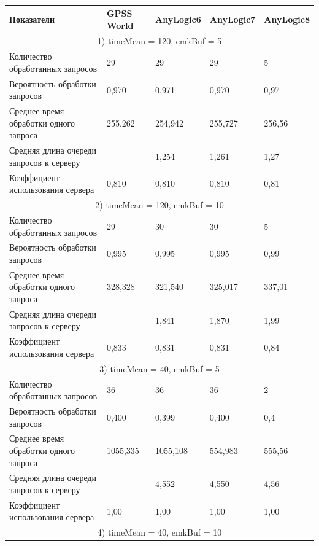 \begin{longtable} {
	|p{}
	|p{}
	|p{}
	|p{}
	|p{}
	|}
	\caption{}
	\label{tabl:exp}\\
	\hline Показатели & GPSS World & AnyLogic6
		& AnyLogic7 & AnyLogic8 \\ \hline
	\endhead

	\multicolumn{5}{|c|}{1) timeMean = 120, emkBuf = 5} \\ \hline
	Количество обработанных запросов & 29 & 29 & 29 & 5 \\ \hline
	Вероятность обработки запросов & 0,970 & 0,971 & 0,970 & 0,97 \\ \hline
	Среднее время обработки одного запроса & 255,262 & 254,942
		& 255,727 & 256,56 \\ \hline
	Средняя длина очереди запросов к серверу & & 1,254 & 1,261 & 1,27 \\ \hline
	Коэффициент использования сервера & 0,810 & 0,810 & 0,810 & 0,81 \\ \hline
	\multicolumn{5}{|c|}{2) timeMean = 120, emkBuf = 10} \\ \hline
	Количество обработанных запросов & 29 & 30 & 30 & 5 \\ \hline
	Вероятность обработки запросов & 0,995 & 0,995 & 0,995 & 0,99 \\ \hline
	Среднее время обработки одного запроса & 328,328 & 321,540
		& 325,017 & 337,01 \\ \hline
	Средняя длина очереди запросов к серверу & & 1,841 & 1,870 & 1,99 \\ \hline
	Коэффициент использования сервера & 0,833 & 0,831 & 0,831 & 0,84 \\ \hline
	\multicolumn{5}{|c|}{3) timeMean = 40, emkBuf = 5}\\ \hline
	Количество обработанных запросов & 36 & 36 & 36 & 2 \\ \hline
	Вероятность обработки запросов & 0,400 & 0,399 & 0,400 & 0,4 \\ \hline
	Среднее время обработки одного запроса & 1055,335 & 1055,108
		& 554,983 & 555,56 \\ \hline
	Средняя длина очереди запросов к серверу & & 4,552 & 4,550 & 4,56 \\ \hline
	Коэффициент использования сервера & 1,00 & 1,00 & 1,00 & 1,00 \\ \hline
	\multicolumn{5}{|c|}{4) timeMean = 40, emkBuf = 10}\\ \hline

\end{longtable}
